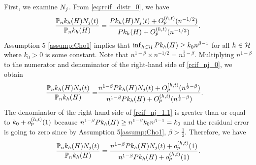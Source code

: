 { %

First, we examine $N_j$. From \cref{eq:rcif_distr_0}, we have
\begin{equation}
\label{rcif_nj_0}
    \frac{\mathbb{P}_nk_h(H)N_j(t)}{\mathbb{P}_nk_h(H)} = \frac{Pk_h(H)N_j(t) + O_p^{(h, t)}(n^{-1/2})}{Pk_h(H) + O_p^{(h, t)}(n^{-1/2})}.
\end{equation}
\newcommand{\tmprate}{n^{\beta-1}}
\newcommand{\tmprateinv}{n^{1-\beta}}
\newcommand{\tmpratetwo}{n^{\frac{1}{2}-\beta}}
\newcommand{\knot}{k_0}
\newcommand{\Ophtsqrtnbeta}{\Op^{\arght}(\tmpratetwo)}
\newcommand{\ophtsqrtnbeta}{\op^{\arght}(\tmpratetwo)}
\newcommand{\numun}{U_n}
Assumption \ifnum{} 5 \else \ref{assump:Cho1} \fi implies that $\inf_{\histlower \in \history} \PkH \ge \knot \tmprate$ for all $h \in \mathcal{H}$ where $\knot > 0 $ is some constant. Note that $\tmprateinv \times n^{-1/2} = \tmpratetwo$. Multiplying $\tmprateinv$ to the numerator and denominator of the right-hand side of \cref{rcif_nj_0}, we obtain
\newcommand{\denomlong}{\tmprateinv \PkH + \Ophtsqrtnbeta}
\begin{align}
\frac{\PnkH\Nj\argt}{\PnkH} = &\frac{\tmprateinv \PkH\Nj\argt + \Ophtsqrtnbeta}{\denomlong}. \label{rcif_nj_1.1}
\end{align}
The denominator of the right-hand side of \cref{rcif_nj_1.1} is greater than or equal to $\knot + \opht$ because $\tmprateinv \PkH \ge \tmprateinv\knot\tmprate =\knot$ and the residual error is going to zero since by Assumption \ifnum{} 5\else \ref{assump:Cho1}\fi, $\beta>\frac{1}{2}$. Therefore, we have
\begin{equation}
    \begin{split}
\frac{\PnkH\Nj\argt}{\PnkH} = \frac{\tmprateinv\PkH\Nj\argt+\opht}{\tmprateinv\PkH+\opht}. \label{rcif_nj_1.2}
    \end{split}
\end{equation}

}
